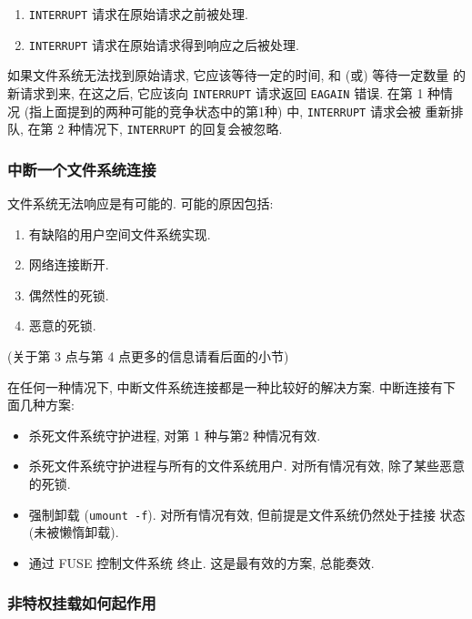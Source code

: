 \documentclass[nofonts]{ctexart}
\begin{document}
\begin{enumerate}
\def\labelenumi{\arabic{enumi}.}
\item
  \texttt{INTERRUPT} 请求在原始请求之前被处理.
\item
  \texttt{INTERRUPT} 请求在原始请求得到响应之后被处理.
\end{enumerate}

如果文件系统无法找到原始请求, 它应该等待一定的时间, 和 (或) 等待一定数量
的新请求到来, 在这之后, 它应该向 \texttt{INTERRUPT} 请求返回
\texttt{EAGAIN} 错误. 在第 1 种情况
(指上面提到的两种可能的竞争状态中的第1种) 中, \texttt{INTERRUPT}
请求会被 重新排队, 在第 2 种情况下, \texttt{INTERRUPT} 的回复会被忽略.

\subsubsection{中断一个文件系统连接}\label{ux4e2dux65adux4e00ux4e2aux6587ux4ef6ux7cfbux7edfux8fdeux63a5}

文件系统无法响应是有可能的. 可能的原因包括:

\begin{enumerate}
\def\labelenumi{\arabic{enumi}.}
\item
  有缺陷的用户空间文件系统实现.
\item
  网络连接断开.
\item
  偶然性的死锁.
\item
  恶意的死锁.
\end{enumerate}

(关于第 3 点与第 4 点更多的信息请看后面的小节)

在任何一种情况下, 中断文件系统连接都是一种比较好的解决方案. 中断连接有下
面几种方案:

\begin{itemize}
\item
  杀死文件系统守护进程, 对第 1 种与第2 种情况有效.
\item
  杀死文件系统守护进程与所有的文件系统用户. 对所有情况有效, 除了某些恶意
  的死锁.
\item
  强制卸载 (\texttt{umount -f}). 对所有情况有效,
  但前提是文件系统仍然处于挂接 状态 (未被懒惰卸载).
\item
  通过 FUSE 控制文件系统 终止. 这是最有效的方案, 总能奏效.
\end{itemize}

\subsubsection{非特权挂载如何起作用}\label{ux975eux7279ux6743ux6302ux8f7dux5982ux4f55ux8d77ux4f5cux7528}
\end{document}
